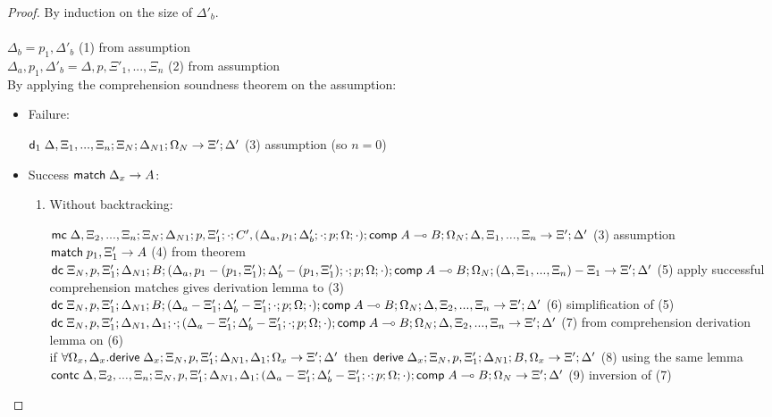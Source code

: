 \begin{proof}
   By induction on the size of $\Delta'_b$.\\
   \\
   $\Delta_b = p_1, \Delta'_b$ \hfill (1) from assumption \\
   $\Delta_a, p_1, \Delta'_b = \Delta, p, \Xi'_1, ..., \Xi_n$ \hfill (2) from assumption \\
   By applying the comprehension soundness theorem on the assumption:\\
      
   \begin{itemize}
      \item Failure:
         
      $\mathsf{d}_1 \; \Delta, \Xi_1, ..., \Xi_n; \Xi_N; \Delta_{N1}; \Omega_N \rightarrow \Xi'; \Delta'$ \hfill (3) assumption (so $n = 0$)\\
         
      \item Success $\mathsf{match} \; \Delta_x \rightarrow A$:
      
      \begin{enumerate}
         
         \item Without backtracking:
         
         $\mathsf{mc} \; \Delta, \Xi_2, ..., \Xi_n; \Xi_N; \Delta_{N1}; p, \Xi'_1; \cdot; C', (\Delta_a, p_1; \Delta'_b; \cdot; p; \Omega; \cdot); \mathsf{comp} \; A \multimap B; \Omega_N; \Delta, \Xi_1, ..., \Xi_n \rightarrow \Xi'; \Delta'$ \hfill (3) assumption \\
         $\mathsf{match} \; p_1, \Xi'_1 \rightarrow A$ \hfill (4) from theorem\\
         $\mathsf{dc} \; \Xi_N, p, \Xi'_1; \Delta_{N1}; B; (\Delta_a, p_1 - (p_1, \Xi'_1); \Delta'_b - (p_1, \Xi'_1); \cdot; p; \Omega; \cdot); \mathsf{comp} \; A \multimap B; \Omega_N; (\Delta, \Xi_1, ..., \Xi_n) - \Xi_1 \rightarrow \Xi'; \Delta'$ \hfill (5) apply successful comprehension matches gives derivation lemma to (3) \\
         $\mathsf{dc} \; \Xi_N, p, \Xi'_1; \Delta_{N1}; B; (\Delta_a - \Xi'_1; \Delta'_b - \Xi'_1; \cdot; p; \Omega; \cdot); \mathsf{comp} \; A \multimap B; \Omega_N; \Delta, \Xi_2, ..., \Xi_n \rightarrow \Xi'; \Delta'$ \hfill (6) simplification of (5) \\
         $\mathsf{dc} \; \Xi_N, p, \Xi'_1; \Delta_{N1}, \Delta_1; \cdot; (\Delta_a - \Xi'_1; \Delta'_b - \Xi'_1; \cdot; p; \Omega; \cdot); \mathsf{comp} \; A \multimap B; \Omega_N; \Delta, \Xi_2, ..., \Xi_n \rightarrow \Xi'; \Delta'$ \hfill (7) from comprehension derivation lemma on (6)\\
         if $\forall \Omega_x, \Delta_x. \mathsf{derive} \; \Delta_x; \Xi_N, p, \Xi'_1; \Delta_{N1}, \Delta_1; \Omega_x \rightarrow \Xi'; \Delta'$ then $\mathsf{derive} \; \Delta_x; \Xi_N, p, \Xi'_1; \Delta_{N1}; B, \Omega_x \rightarrow \Xi'; \Delta'$ \hfill (8) using the same lemma \\
         $\mathsf{contc} \; \Delta, \Xi_2, ..., \Xi_n; \Xi_N, p, \Xi'_1; \Delta_{N1}, \Delta_1; (\Delta_a - \Xi'_1; \Delta'_b - \Xi'_1; \cdot; p; \Omega; \cdot); \mathsf{comp} \; A \multimap B; \Omega_N \rightarrow \Xi'; \Delta'$ \hfill (9) inversion of (7) \\   
      

\end{enumerate}
\end{itemize}
\end{proof}

